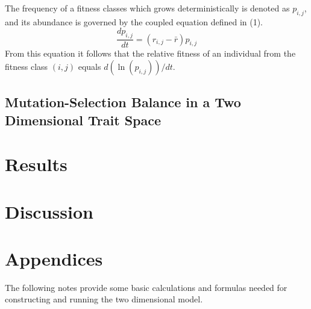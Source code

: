\documentclass{article}
\begin{document}
The frequency of a fitness classes which grows deterministically is denoted as $p_{i,j}$, and its abundance is governed by the coupled equation defined in (1).
\begin{equation}
\frac{dp_{i,j}}{dt}=(r_{i,j}-\bar{r})p_{i,j}
\end{equation}
From this equation it follows that the relative fitness of an individual from the fitness class $(i,j)$ equals $d(\ln(p_{i,j}))/dt$.  


\subsection*{Mutation-Selection Balance in a Two Dimensional Trait Space}


\section*{Results}

\section*{Discussion}

\section*{Appendices}
The following notes provide some basic calculations and formulas needed for constructing and running the two dimensional model.




\end{document}
